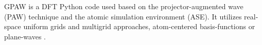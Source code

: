 GPAW is a DFT Python code used based on the projector-augmented wave (PAW) technique \cite{Bl_chl_1994} \cite{Kresse_1999}and the atomic simulation environment (ASE). It utilizes real-space uniform grids and multigrid approaches, atom-centered basis-functions or plane-waves \cite{Mortensen_2005} \cite{Enkovaara_2010}.